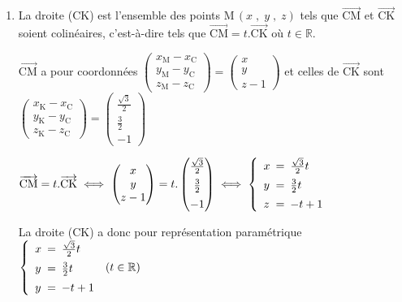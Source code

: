\documentclass[10pt]{article}
\providecommand{\R}{\mathbb{R}}
\providecommand{\vectt}[1]{\overrightarrow{\mathrm{#1}}}
\begin{document}
\begin{enumerate}
\item 
La droite (CK) est l'ensemble des points M\,$\left (x\;,\; y \;,\; z\right )$ tels que $\vectt{CM}$ et $\vectt{CK}$ soient colinéaires, c'est-à-dire tels que $\vectt{CM} = t.\vectt{CK}$ où $t\in\R$.

$\vectt{CM}$ a pour coordonnées  
$\begin{pmatrix}
x_{\text{M}} - x_{\text{C}} \\ y_{\text{M}} - y_{\text{C}} \\ z_{\text{M}} - z_{\text{C}}
\end{pmatrix}
=
\begin{pmatrix}
x\\ y \\ z -1
\end{pmatrix}$
et celles de $\vectt{CK}$ sont
$\begin{pmatrix}
x_{\text{K}} - x_{\text{C}} \\ y_{\text{K}} - y_{\text{C}} \\ z_{\text{K}} - z_{\text{C}}
\end{pmatrix}
=
\begin{pmatrix}
\frac{\sqrt{3}}{2}\\[5pt] \frac{3}{2} \\[5pt] -1
\end{pmatrix}$

$\vectt{CM} = t.\vectt{CK}
\iff
\begin{pmatrix}
x\\ y \\ z-1
\end{pmatrix}
=
t.\begin{pmatrix}
\frac{\sqrt{3}}{2}\\[5pt] \frac{3}{2} \\[5pt] -1
\end{pmatrix}
\iff
\left \{
\begin{array}{l !{=} l}
x & \frac{\sqrt{3}}{2} t\\[5pt]
y & \frac{3}{2} t\\[5pt]
z & -t+1
\end{array}
\right .
$

La droite (CK) a donc pour représentation paramétrique 
$\left\{\begin{array}{l !{=} l}
x& \frac{\sqrt 3}{2}t\\[5pt]
y& \frac32 t\\[5pt]
y& - t + 1
\end{array}\right. \: (t \in \R)$


\end{enumerate}
\end{document}
